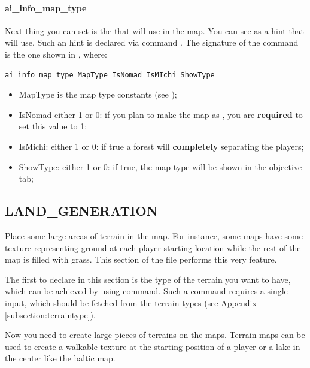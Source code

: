     \paragraph{ai\_info\_map\_type}

    Next thing you can set is the  that \aoe{} will use in the map. You can see as a hint that \aoe{} will use. Such an hint is declared via command . The signature of the command is the one shown in , where:

    \begin{lstlisting}[language=rms,label=rms:setai]
        ai_info_map_type MapType IsNomad IsMIchi ShowType
    \end{lstlisting}

    \begin{itemize}
        \item MapType is the map type constants (see );
        \item IsNomad either 1 or 0: if you plan to make the map as , you are \textbf{required} to set this value to 1;
        \item IsMichi: either 1 or 0: if true a forest will \textbf{completely} separating the players;
        \item ShowType: either 1 or 0: if true, the map type will be shown in the objective tab;
    \end{itemize}

    \subsection{LAND\_GENERATION}

    Place some large areas of terrain in the map. For instance, some maps have some texture representing ground at each player starting location while the rest of the map is filled with grass. This section of the file performs this very feature.

    The first to declare in this section is the type of the terrain you want to have, which can be achieved by using  command. Such a command requires a single input, which should be fetched from the terrain types (see Appendix \ref{subsection:terraintype}).

    Now you need to create large pieces of terrains on the maps. Terrain maps can be used to create a walkable texture at the starting position of a player or a lake in the center like the baltic map\cite{zetnus:2015}.


